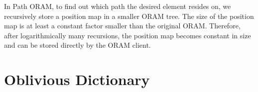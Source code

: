 \documentclass[11pt]{article}
\begin{document}
In Path ORAM, to find out which path the desired element 
resides on, we recursively store a position map 
in  a smaller ORAM tree. 
The size of the position map is at least a constant factor
smaller than the original ORAM. Therefore, after logarithmically
many recursions, the position map becomes constant in size
and can be stored directly by the ORAM client.






\section{Oblivious Dictionary}
\end{document}
